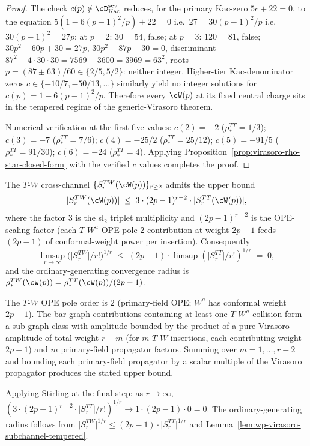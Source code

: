 \begin{proof}
The check $c(p) \notin \cD^{\mathrm{sev}}_{\mathrm{Kac}}$ reduces, for
the primary Kac-zero $5c + 22 = 0$, to the equation
$5(1 - 6(p-1)^2/p) + 22 = 0$ i.e.\ $27 = 30(p-1)^2/p$ i.e.\
$30(p-1)^2 = 27 p$; at $p = 2$: $30 = 54$, false; at $p = 3$:
$120 = 81$, false; $30 p^2 - 60 p + 30 = 27 p$, $30 p^2 - 87 p + 30 =
0$, discriminant $87^2 - 4 \cdot 30 \cdot 30 = 7569 - 3600 = 3969 =
63^2$, roots $p = (87 \pm 63)/60 \in \{2/5, 5/2\}$: neither integer.
Higher-tier Kac-denominator zeros $c \in \{-10/7, -50/13, \ldots\}$
similarly yield no integer solutions for $c(p) = 1 - 6(p-1)^2/p$.
Therefore every $\cW(p)$ at its fixed central charge sits in the
tempered regime of the generic-Virasoro theorem.

Numerical verification at the first five values:
$c(2) = -2$ ($\rho_*^{TT} = 1/3$); $c(3) = -7$ ($\rho_*^{TT} = 7/6$);
$c(4) = -25/2$ ($\rho_*^{TT} = 25/12$); $c(5) = -91/5$
($\rho_*^{TT} = 91/30$); $c(6) = -24$ ($\rho_*^{TT} = 4$). Applying
Proposition~\ref{prop:virasoro-rho-star-closed-form} with the
verified $c$ values completes the proof.
\end{proof}

\begin{conjecture}
\label{lem:wp-tw-subchannel-tempered}
The $T$-$W$ cross-channel $\{S_r^{TW}(\cW(p))\}_{r \ge 2}$ admits the
upper bound
\[
 \lvert S_r^{TW}(\cW(p)) \rvert
 \;\le\;
 3 \cdot (2p - 1)^{r - 2}
 \cdot \lvert S_r^{TT}(\cW(p)) \rvert,
\]
where the factor $3$ is the sl$_2$ triplet multiplicity and
$(2p - 1)^{r-2}$ is the OPE-scaling factor (each $T$-$W^a$ OPE pole-2
contribution at weight $2p-1$ feeds $(2p-1)$ of conformal-weight
power per insertion). Consequently
\[
 \limsup_{r \to \infty}
 \bigl( \lvert S_r^{TW} \rvert / r! \bigr)^{1/r} \;\le\;
 (2p - 1) \cdot \limsup (\lvert S_r^{TT} \rvert / r!)^{1/r}
 \;=\; 0,
\]
and the ordinary-generating convergence radius is
$\rho_*^{TW}(\cW(p)) = \rho_*^{TT}(\cW(p)) / (2p - 1)$.
\end{conjecture}

\begin{remark}
The $T$-$W$ OPE pole order is $2$ (primary-field OPE; $W^a$ has
conformal weight $2p - 1$). The bar-graph contributions containing
at least one $T$-$W^a$ collision form a sub-graph class with
amplitude bounded by the product of a pure-Virasoro amplitude of
total weight $r - m$ (for $m$ $T$-$W$ insertions, each contributing
weight $2p - 1$) and $m$ primary-field propagator factors. Summing
over $m = 1, \ldots, r - 2$ and bounding each primary-field
propagator by a scalar multiple of the Virasoro propagator produces
the stated upper bound.

Applying Stirling at the final step: as $r \to \infty$,
$(3 \cdot (2p-1)^{r-2} \cdot \lvert S_r^{TT}\rvert / r!)^{1/r}
\to 1 \cdot (2p-1) \cdot 0 = 0$. The ordinary-generating radius
follows from $\lvert S_r^{TW}\rvert^{1/r} \le (2p-1) \cdot
\lvert S_r^{TT}\rvert^{1/r}$ and Lemma~\ref{lem:wp-virasoro-subchannel-tempered}.
\end{remark}

